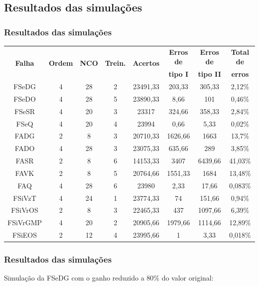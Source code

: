 \documentclass{beamer}
\begin{document}
\subsection{Resultados das simulações}
\begin{frame}
    \frametitle{Resultados das simulações}

\begin{table}[htb]
\scriptsize
\begin{tabular}{|c|c|c|c|c|c|c|c|}
\hline
\multirow{2}{*}{\bf Falha} &
\multirow{2}{*}{\bf Ordem} &
\multirow{2}{*}{\bf NCO} &
\multirow{2}{*}{\bf Trein.} &
\multirow{2}{*}{\bf Acertos} &
{\bf Erros de} & {\bf Erros de} & {\bf Total de}\\
& & & & & {\bf tipo I} & {\bf tipo II} & {\bf erros}\\
\hline
\hline
FSeDG & 4 & 28 & 2 & 23491,33 & 203,33 & 305,33 & 2,12\%\\
\hline
FSeDO & 4 & 28 & 5 & 23890,33 & 8,66 & 101 & 0,46\%\\
\hline
FSeSR & 4 & 20 & 3 & 23317 & 324,66 & 358,33 & 2,84\%\\
\hline
FSeQ & 4 & 20 & 4 & 23994 & 0,66 & 5,33 & 0,02\%\\
\hline
FADG & 2 & 8 & 3 & 20710,33 & 1626,66 & 1663 & 13,7\%\\
\hline
FADO & 4 & 28 & 3 & 23075,33 & 635,66 & 289 & 3,85\%\\
\hline
\alert<2->{FASR} & 2 & 8 & 6 & 14153,33 & 3407 & 6439,66 & \alert<2->{41,03\%}\\
\hline
FAVK & 2 & 8 & 5 & 20764,66 & 1551,33 & 1684 & 13,48\%\\
\hline
FAQ & 4 & 28 & 6 & 23980 & 2,33 & 17,66 & 0,083\%\\
\hline
FSiVzT & 4 & 24 & 1 & 23774,33 & 74 & 151,66 & 0,94\%\\
\hline
FSiVrOS & 2 & 8 & 3 & 22465,33 & 437 & 1097,66 & 6,39\%\\
\hline
FSiVrGMP & 4 & 20 & 2 & 20905,66 & 1979,66 & 1114,66 & 12,89\%\\
\hline
\alert<2->{FSiEOS} & 2 & 12 & 4 & 23995,66 & 1 & 3,33 & \alert<2->{0,018\%}\\
\hline
\end{tabular}
\end{table}
\end{frame}

\begin{frame}
    \frametitle{Resultados das simulações}

\footnotesize Simulação da FSeDG com o ganho reduzido a 80\% do valor original:

\begin{figure}[htb]
\footnotesize
\centering
\scalebox{0.68}{}
\end{figure}
    
\end{frame}
\end{document}
